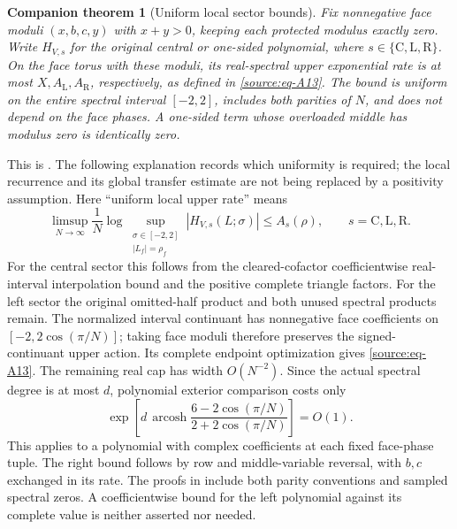 \documentclass[11pt]{article}
\numberwithin{equation}{section}
\newtheorem{foundation}{Companion theorem}
\begin{document}
\begin{foundation}[Uniform local sector bounds]\label{found:envelopes}
Fix nonnegative face moduli \((x,b,c,y)\) with \(x+y>0\), keeping each
protected modulus exactly zero. Write \(H_{V,s}\) for the original
central or one-sided polynomial, where \(s\in\{\mathrm C,\mathrm L,\mathrm R\}\).
On the face torus with these moduli, its real-spectral upper exponential
rate is at most \(X,A_{\mathrm L},A_{\mathrm R}\), respectively, as
defined in \eqref{source:eq-A13}. The bound is uniform on the entire
spectral interval \([-2,2]\), includes both parities of \(N\), and
does not depend on the face phases. A one-sided term whose overloaded
middle has modulus zero is identically zero.
\end{foundation}

This is \cite[Theorem 1.1]{CasimirSources}. The following explanation records
which uniformity is required; the local recurrence and its global
transfer estimate are not being replaced by a positivity assumption.
Here ``uniform local upper rate'' means \begin{equation}\label{source:eq-A15}
\limsup_{N\to\infty}\frac1N
 \log\sup_{\substack{\sigma\in[-2,2]\\|L_f|=\rho_f}}
 |H_{V,s}(L;\sigma)|\le A_s(\rho),\qquad s=\mathrm C,\mathrm L,\mathrm R.
\end{equation} For the central sector this follows from the cleared-cofactor coefficientwise
real-interval interpolation bound and the positive complete triangle
factors. For the left sector the original omitted-half product and both unused
spectral products remain. The normalized interval continuant has
nonnegative face coefficients on \([-2,2\cos(\pi/N)]\); taking face
moduli therefore preserves the signed-continuant upper action. Its
complete endpoint optimization gives \eqref{source:eq-A13}. The remaining real cap has
width \(O(N^{-2})\). Since the actual spectral degree is at most \(d\),
polynomial exterior comparison costs only \begin{equation}\label{source:eq-A16}
\exp\left[d\,\operatorname{arcosh}
   \frac{6-2\cos(\pi/N)}{2+2\cos(\pi/N)}\right]=O(1).
\end{equation} This applies to a polynomial with complex coefficients at each fixed
face-phase tuple. The right bound follows by row and middle-variable reversal, with
\(b,c\) exchanged in its rate. The proofs in
\cite[Sections 3--7]{CasimirSources} include both parity conventions and
sampled spectral zeros. A coefficientwise bound for the left polynomial
against its complete value is neither
asserted nor needed.
\end{document}
